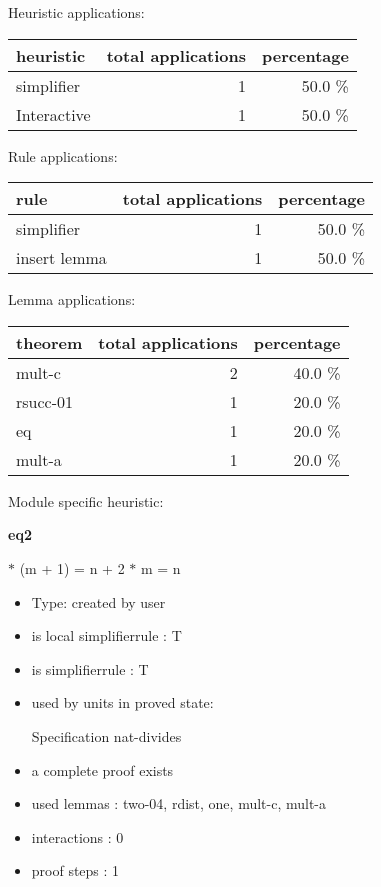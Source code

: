 \documentclass[a4paper]{article}
\begin{document}
\medskip


Heuristic applications:

\begin{supertabular}{l|r|r}
heuristic	& total applications & percentage \\ \hline
simplifier & 1 & 50.0 \% \\
Interactive & 1 & 50.0 \% \\

\end{supertabular}

Rule applications:

\begin{supertabular}{l|r|r}
rule	        & total applications & percentage \\ \hline
simplifier & 1 & 50.0 \% \\
insert lemma & 1 & 50.0 \% \\

\end{supertabular}

Lemma applications:

\begin{supertabular}{l|r|r}
theorem	        & total applications & percentage \\ \hline
mult-c & 2 & 40.0 \% \\
rsucc-01 & 1 & 20.0 \% \\
eq & 1 & 20.0 \% \\
mult-a & 1 & 20.0 \% \\

\end{supertabular}

Module specific heuristic:

\pagebreak

{\LARGE\bf eq2}\label{lemma-eq2}

\medskip

  $*$ (m + 1) = n + 2  $*$ m = n

\begin{itemize}

\item Type: created by user

\item is local simplifierrule : T
\item is simplifierrule : T
\item used by units in proved state:

Specification nat-divides
\item       a complete proof exists
\item       used lemmas  : two-04, rdist, one, mult-c, mult-a
\item       interactions : 0
\item       proof steps  : 1
\end{itemize}
\end{document}
